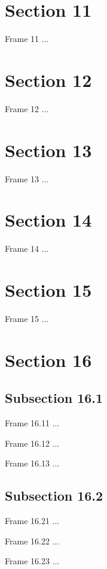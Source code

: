 \documentclass{beamer}
\begin{document}
\section{Section 11}
\begin{frame}{Frame 11}
...
\end{frame}

\section{Section 12}
\begin{frame}{Frame 12}
...
\end{frame}

\section{Section 13}
\begin{frame}{Frame 13}
...
\end{frame}

\section{Section 14}
\begin{frame}{Frame 14}
...
\end{frame}

\section{Section 15}
\begin{frame}{Frame 15}
...
\end{frame}

\section{Section 16}
\subsection{Subsection 16.1}
\begin{frame}{Frame 16.11}
...
\end{frame}
\begin{frame}{Frame 16.12}
...
\end{frame}
\begin{frame}{Frame 16.13}
...
\end{frame}
\subsection{Subsection 16.2}
\begin{frame}{Frame 16.21}
...
\end{frame}
\begin{frame}{Frame 16.22}
...
\end{frame}
\begin{frame}{Frame 16.23}
...
\end{frame}
\end{document}
